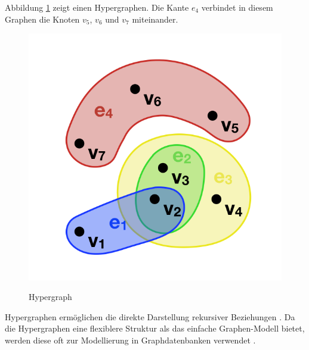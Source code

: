 Abbildung \ref{fig:hyper} zeigt einen Hypergraphen.
Die Kante $e_{4}$ verbindet in diesem Graphen die Knoten $v_{5}$, $v_{6}$ und $v_{7}$ miteinander.
\begin{figure}[H]
\begin{center}
	\includegraphics[scale = 0.5]{./images/Hypergraph2.png}
	\label{fig:hyper}
	\caption{Hypergraph}
\end{center}
\end{figure}
Hypergraphen ermöglichen die direkte Darstellung rekursiver Beziehungen \cite{iordanov2010hypergraphdb}.
Da die Hypergraphen eine flexiblere Struktur als das einfache Graphen-Modell bietet, werden diese oft zur Modellierung in Graphdatenbanken verwendet \cite{flockdb}.
